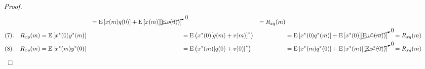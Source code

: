 \begin{proof}
\begin{align*}
      &&= \operatorname{E}{\left[x(m) q(0)\right]} + \operatorname{E}{\left[x(m)\right]}\cancelto{0}{{\left[\operatorname{E}{v(0))}\right]}}
      &&=    R_{xq}(m)
    \\
    (7).\quad R_{xy}(m)
      &= \operatorname{E}{\left[x^\ast(0)y^\ast(m)\right]}
      &&= \operatorname{E}{\left(x^\ast(0) {\left[q(m) + v(m)\right]}^\ast\right)}
      &&= \operatorname{E}{\left[x^\ast(0) q^\ast(m)\right]} + \operatorname{E}{\left[x^\ast(0)\right]}\cancelto{0}{{\left[\operatorname{E}{v^\ast(m))}\right]}}
      &&=    R_{xq}(m)
    \\
    (8).\quad R_{xy}(m)
      &= \operatorname{E}{\left[x^\ast(m)y^\ast(0)\right]}
      &&= \operatorname{E}{\left(x^\ast(m) {\left[q(0) + v(0)\right]}^\ast\right)}
      &&= \operatorname{E}{\left[x^\ast(m) q^\ast(0)\right]} + \operatorname{E}{\left[x^\ast(m)\right]}\cancelto{0}{{\left[\operatorname{E}{v^\ast(0))}\right]}}
      &&=    R_{xq}(m)
  \end{align*}
\end{proof}

